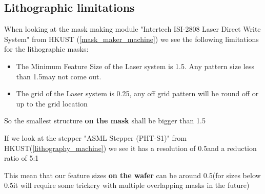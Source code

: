 \subsection{Lithographic limitations}
When looking at the mask making module "Intertech ISI-2808 Laser Direct Write System" from HKUST (\autoref{mask_maker_machine}) we see the following limitations for the lithographic masks:
\begin{itemize}
	\item The Minimum Feature Size of the Laser system is 1.5\um. Any pattern size less than 1.5\um may not come out.
	\item The grid of the Laser system is 0.25\um, any off grid pattern will be round off or up to the grid location
\end{itemize}

So the smallest structure \textbf{on the mask} shall be bigger than 1.5\um

If we look at the stepper "ASML Stepper (PHT-S1)" from HKUST(\autoref{lithography_machine}) we see it has a resolution of 0.5\um and a reduction ratio of 5:1

This mean that our feature sizes \textbf{on the wafer} can be around 0.5\um (for sizes below 0.5\um it will require some trickery with multiple overlapping masks in the future)